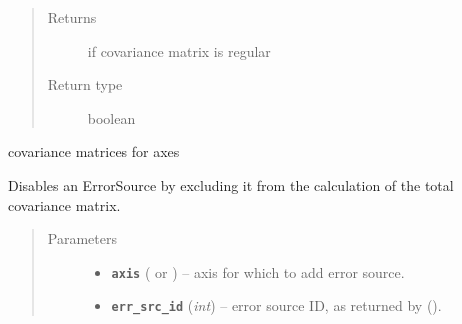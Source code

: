 \documentclass[a4paper,10pt,english]{sphinxmanual}
\begin{document}
\begin{fulllineitems}
\begin{fulllineitems}
\begin{quote}
\begin{description}
\item[{Returns}] \leavevmode
{} if covariance matrix is regular

\item[{Return type}] \leavevmode
boolean

\end{description}\end{quote}

\end{fulllineitems}


\begin{fulllineitems}
\label{module_doc:kafe.dataset.Dataset.cov_mats}
covariance matrices for axes

\end{fulllineitems}


\begin{fulllineitems}
\label{module_doc:kafe.dataset.Dataset.disable_error_source}
Disables an ErrorSource by excluding it from the calculation of the
total covariance matrix.
\begin{quote}\begin{description}
\item[{Parameters}] \leavevmode\begin{itemize}
\item {} 
\textbf{\texttt{axis}} ( or ) -- axis for which to add error source.

\item {} 
\textbf{\texttt{err\_src\_id}} (\emph{int}) -- error source ID, as returned by
{\hyperref[module_doc:kafe.dataset.Dataset.add_error_source]{\emph{}}} ().

\end{itemize}

\end{description}\end{quote}

\end{fulllineitems}



\end{fulllineitems}
\end{document}
